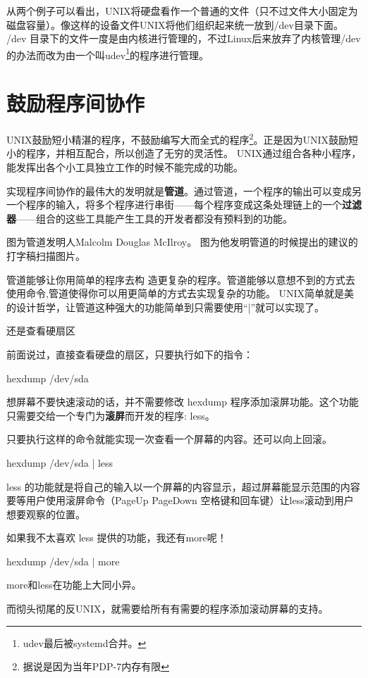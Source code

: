 从两个例子可以看出，UNIX将硬盘看作一个普通的文件（只不过文件大小固定为磁盘容量）。像这样的设备文件UNIX将他们组织起来统一放到/dev目录下面。
/dev 目录下的文件一度是由内核进行管理的，不过Linux后来放弃了内核管理/dev的办法而改为由一个叫udev\footnote{udev最后被systemd合并。}的程序进行管理。


\section{鼓励程序间协作}

UNIX鼓励短小精湛的程序，不鼓励编写大而全式的程序\footnote{据说是因为当年PDP-7内存有限}。正是因为UNIX鼓励短小的程序，并相互配合，所以创造了无穷的灵活性。
UNIX通过组合各种小程序，能发挥出各个小工具独立工作的时候不能完成的功能。

实现程序间协作的最伟大的发明就是\textbf{管道}。通过管道，一个程序的输出可以变成另一个程序的输入，将多个程序进行串街------每个程序变成这条处理链上的一个\textbf{过滤器}------组合的这些工具能产生工具的开发者都没有预料到的功能。


图\thefigure 为管道发明人Malcolm Douglas McIlroy。  图\thefigure 为他发明管道的时候提出的建议的打字稿扫描图片。

管道能够让你用简单的程序去构 造更复杂的程序。管道能够以意想不到的方式去使用命令,管道使得你可以用更简单的方式去实现复杂的功能。
UNIX简单就是美的设计哲学，让管道这种强大的功能简单到只需要使用“|”就可以实现了。

\begin{example}{还是查看硬扇区}

前面说过，直接查看硬盘的扇区，只要执行如下的指令：
\begin{code}
hexdump /dev/sda
\end{code}

想屏幕不要快速滚动的话，并不需要修改 hexdump 程序添加滚屏功能。这个功能只需要交给一个专门为\textbf{滚屏}而开发的程序: less。

只要执行这样的命令就能实现一次查看一个屏幕的内容。还可以向上回滚。
\begin{code}
hexdump /dev/sda | less
\end{code}

less 的功能就是将自己的输入以一个屏幕的内容显示，超过屏幕能显示范围的内容要等用户使用滚屏命令（PageUp PageDown 空格键和回车键）让less滚动到用户想要观察的位置。

如果我不太喜欢 less 提供的功能，我还有more呢！
\begin{code}
hexdump /dev/sda | more
\end{code}

more和less在功能上大同小异。

而彻头彻尾的反UNIX，就需要给所有有需要的程序添加滚动屏幕的支持。

\end{example}

